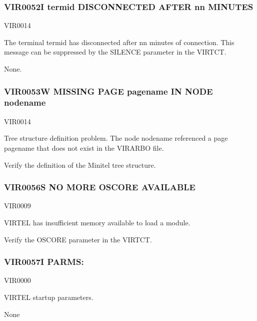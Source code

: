 \documentclass[letterpaper,10pt,english]{sphinxmanual}
\begin{document}
\subsubsection{VIR0052I termid DISCONNECTED AFTER nn MINUTES}
\label{\detokenize{messages:vir0052i-termid-disconnected-after-nn-minutes}}\begin{description}
\sphinxAtStartPar
VIR0014

\sphinxAtStartPar
The terminal termid has disconnected after nn minutes of connection. This message can be suppressed by the SILENCE parameter in the VIRTCT.

\sphinxAtStartPar
None.

\end{description}


\subsubsection{VIR0053W MISSING PAGE pagename IN NODE nodename}
\label{\detokenize{messages:vir0053w-missing-page-pagename-in-node-nodename}}\begin{description}
\sphinxAtStartPar
VIR0014

\sphinxAtStartPar
Tree structure definition problem. The node nodename referenced a page pagename that does not exist in the VIRARBO file.

\sphinxAtStartPar
Verify the definition of the Minitel tree structure.

\end{description}


\subsubsection{VIR0056S NO MORE OSCORE AVAILABLE}
\label{\detokenize{messages:vir0056s-no-more-oscore-available}}\begin{description}
\sphinxAtStartPar
VIR0009

\sphinxAtStartPar
VIRTEL has insufficient memory available to load a module.

\sphinxAtStartPar
Verify the OSCORE parameter in the VIRTCT.

\end{description}


\subsubsection{VIR0057I PARMS:}
\label{\detokenize{messages:vir0057i-parms}}\begin{description}
\sphinxAtStartPar
VIR0000

\sphinxAtStartPar
VIRTEL startup parameters.

\sphinxAtStartPar
None

\end{description}
\end{document}
